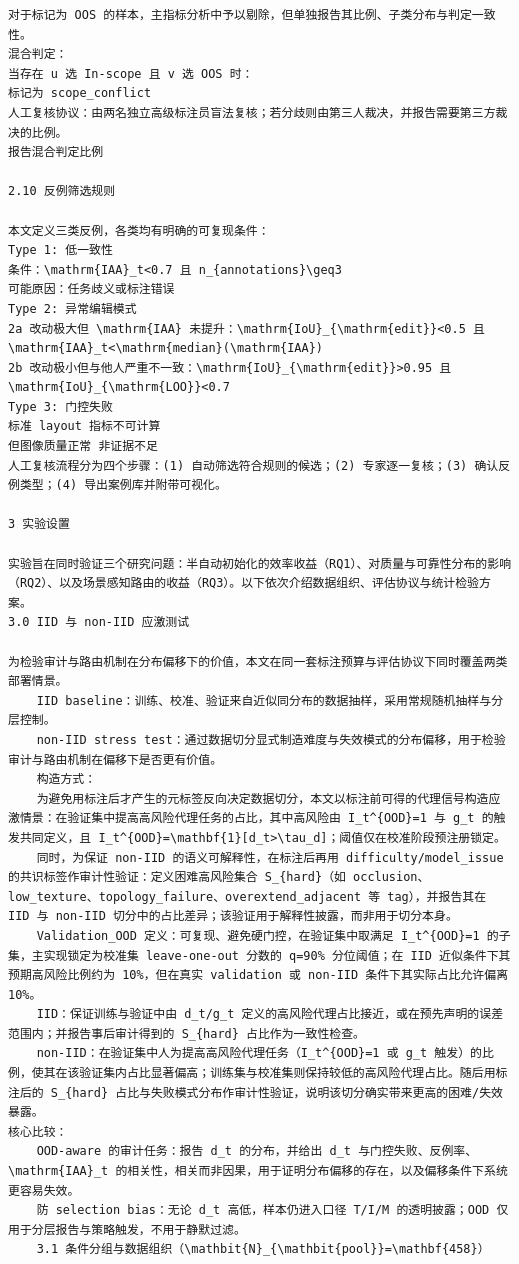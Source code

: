 \documentclass[a4paper,12pt]{article}
\begin{document}
\begin{Verbatim}[fontsize=\small,breaklines=true,breakanywhere=true]
对于标记为 OOS 的样本，主指标分析中予以剔除，但单独报告其比例、子类分布与判定一致性。
混合判定：
当存在 u 选 In-scope 且 v 选 OOS 时：
标记为 scope_conflict
人工复核协议：由两名独立高级标注员盲法复核；若分歧则由第三人裁决，并报告需要第三方裁决的比例。
报告混合判定比例

2.10 反例筛选规则

本文定义三类反例，各类均有明确的可复现条件：
Type 1: 低一致性
条件：\mathrm{IAA}_t<0.7 且 n_{annotations}\geq3
可能原因：任务歧义或标注错误
Type 2: 异常编辑模式
2a 改动极大但 \mathrm{IAA} 未提升：\mathrm{IoU}_{\mathrm{edit}}<0.5 且 \mathrm{IAA}_t<\mathrm{median}(\mathrm{IAA})
2b 改动极小但与他人严重不一致：\mathrm{IoU}_{\mathrm{edit}}>0.95 且 \mathrm{IoU}_{\mathrm{LOO}}<0.7
Type 3: 门控失败
标准 layout 指标不可计算
但图像质量正常 非证据不足
人工复核流程分为四个步骤：(1) 自动筛选符合规则的候选；(2) 专家逐一复核；(3) 确认反例类型；(4) 导出案例库并附带可视化。

3 实验设置

实验旨在同时验证三个研究问题：半自动初始化的效率收益（RQ1）、对质量与可靠性分布的影响（RQ2）、以及场景感知路由的收益（RQ3）。以下依次介绍数据组织、评估协议与统计检验方案。
3.0 IID 与 non-IID 应激测试

为检验审计与路由机制在分布偏移下的价值，本文在同一套标注预算与评估协议下同时覆盖两类部署情景。
	IID baseline：训练、校准、验证来自近似同分布的数据抽样，采用常规随机抽样与分层控制。
	non-IID stress test：通过数据切分显式制造难度与失效模式的分布偏移，用于检验审计与路由机制在偏移下是否更有价值。
	构造方式：
	为避免用标注后才产生的元标签反向决定数据切分，本文以标注前可得的代理信号构造应激情景：在验证集中提高高风险代理任务的占比，其中高风险由 I_t^{OOD}=1 与 g_t 的触发共同定义，且 I_t^{OOD}=\mathbf{1}[d_t>\tau_d]；阈值仅在校准阶段预注册锁定。
	同时，为保证 non-IID 的语义可解释性，在标注后再用 difficulty/model_issue 的共识标签作审计性验证：定义困难高风险集合 S_{hard}（如 occlusion、low_texture、topology_failure、overextend_adjacent 等 tag），并报告其在 IID 与 non-IID 切分中的占比差异；该验证用于解释性披露，而非用于切分本身。
	Validation_OOD 定义：可复现、避免硬门控，在验证集中取满足 I_t^{OOD}=1 的子集，主实现锁定为校准集 leave-one-out 分数的 q=90% 分位阈值；在 IID 近似条件下其预期高风险比例约为 10%，但在真实 validation 或 non-IID 条件下其实际占比允许偏离 10%。
	IID：保证训练与验证中由 d_t/g_t 定义的高风险代理占比接近，或在预先声明的误差范围内；并报告事后审计得到的 S_{hard} 占比作为一致性检查。
	non-IID：在验证集中人为提高高风险代理任务（I_t^{OOD}=1 或 g_t 触发）的比例，使其在该验证集内占比显著偏高；训练集与校准集则保持较低的高风险代理占比。随后用标注后的 S_{hard} 占比与失败模式分布作审计性验证，说明该切分确实带来更高的困难/失效暴露。	
核心比较：
	OOD-aware 的审计任务：报告 d_t 的分布，并给出 d_t 与门控失败、反例率、\mathrm{IAA}_t 的相关性，相关而非因果，用于证明分布偏移的存在，以及偏移条件下系统更容易失效。
	防 selection bias：无论 d_t 高低，样本仍进入口径 T/I/M 的透明披露；OOD 仅用于分层报告与策略触发，不用于静默过滤。
	3.1 条件分组与数据组织（\mathbit{N}_{\mathbit{pool}}=\mathbf{458}）


\end{Verbatim}
\end{document}
